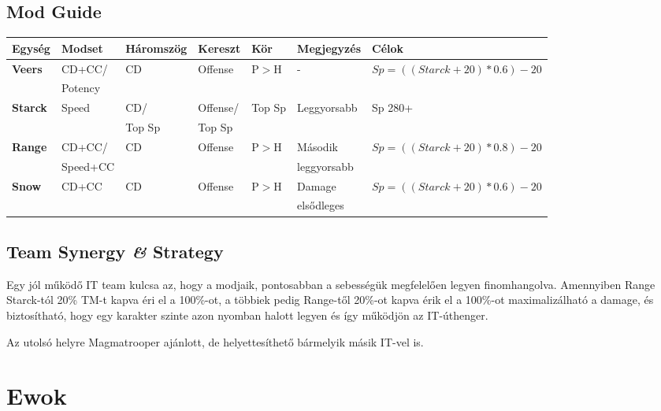 \documentclass[11pt]{report}
\begin{document}
\section{Mod Guide}
\begin{center}
    \begin{tabular}{|l | l | l | l | l | l | l |}
        \hline
        Egység & Modset & Háromszög & Kereszt & Kör & Megjegyzés & Célok\\ \hline
        \textbf{Veers} & CD+CC/ & CD & Offense & P$>$H & - & $Sp = ((Starck+20)*0.6)-20$\\
        & Potency &  &  &  &  & \\ \hline
        \textbf{Starck} & Speed & CD/ & Offense/ & Top Sp & Leggyorsabb & Sp 280+\\
        &  & Top Sp & Top Sp &  &  & \\ \hline
        \textbf{Range} & CD+CC/ & CD & Offense & P$>$H & Második & $Sp = ((Starck+20)*0.8)-20$\\
        & Speed+CC &  &  &  & leggyorsabb & \\ \hline
        \textbf{Snow} & CD+CC & CD & Offense & P$>$H & Damage & $Sp = ((Starck+20)*0.6)-20$\\
        &  &  &  &  & elsődleges & \\ \hline
    \end{tabular}
\end{center}
\section{Team Synergy \textit{\&} Strategy}
Egy jól működő IT team kulcsa az, hogy a modjaik, pontosabban a sebességük megfelelően legyen finomhangolva. Amennyiben Range Starck-tól 20\% TM-t kapva éri el a 100\%-ot, a többiek pedig Range-től 20\%-ot kapva érik el a 100\%-ot maximalizálható a damage, és biztosítható, hogy egy karakter szinte azon nyomban halott legyen és így működjön az IT-úthenger.\par
Az utolsó helyre Magmatrooper ajánlott, de helyettesíthető bármelyik másik IT-vel is.

\chapter{Ewok}
\end{document}
